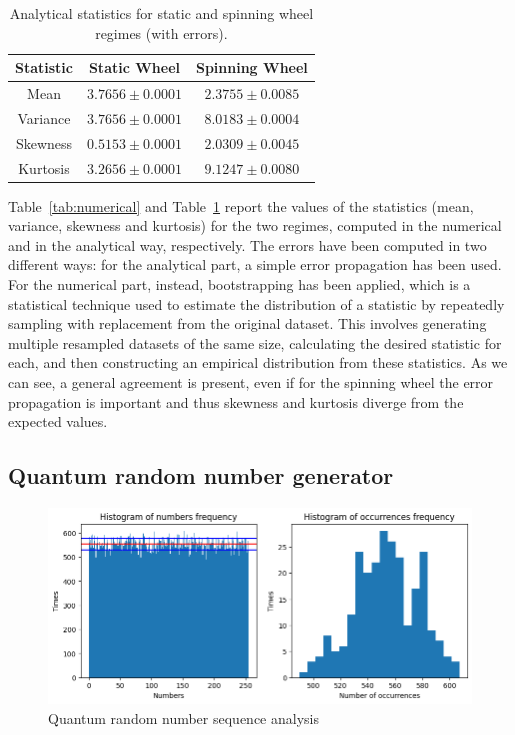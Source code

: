 \documentclass[prl,twocolumn]{revtex4-1}
\begin{document}
\begin{table}[htbp]
    \centering
    \begin{tabular}{|c||c||c|}
        \hline
        \textbf{Statistic} & \textbf{Static Wheel}  & \textbf{Spinning Wheel}  \\ 
        \hline
        \hline
        Mean               & $3.7656 \pm 0.0001$                & $2.3755 \pm 0.0085$                     \\ 
        \hline
        Variance           & $3.7656 \pm 0.0001$                & $8.0183 \pm 0.0004$                                \\ 
        \hline
        Skewness           & $0.5153 \pm 0.0001$                & $2.0309 \pm 0.0045$                                \\ 
        \hline
        Kurtosis           & $3.2656 \pm 0.0001$                & $9.1247 \pm 0.0080$                                \\ 
        \hline
    \end{tabular}
    \caption{Analytical statistics for static and spinning wheel regimes (with errors).}
    \label{tab:analytical}
\end{table}

Table~\ref{tab:numerical} and Table~\ref{tab:analytical} report the values of the statistics (mean, variance, skewness and kurtosis) for the two regimes, computed in the numerical and in the analytical way, respectively. The errors have been computed in two different ways: for the analytical part, a simple error propagation has been used. For the numerical part, instead, bootstrapping has been applied, which is a statistical technique used to estimate the distribution of a statistic by repeatedly sampling with replacement from the original dataset. This involves generating multiple resampled datasets of the same size, calculating the desired statistic for each, and then constructing an empirical distribution from these statistics. As we can see, a general agreement is present, even if for the spinning wheel the error propagation is important and thus skewness and kurtosis diverge from the expected values. 

\subsection{Quantum random number generator}
\begin{figure}
    \centering
    \includegraphics[width=\linewidth]{Images/qrng_stats.png}
    \caption{Quantum random number sequence analysis}
    \label{fig:qrng_stats}
\end{figure}
\end{document}
